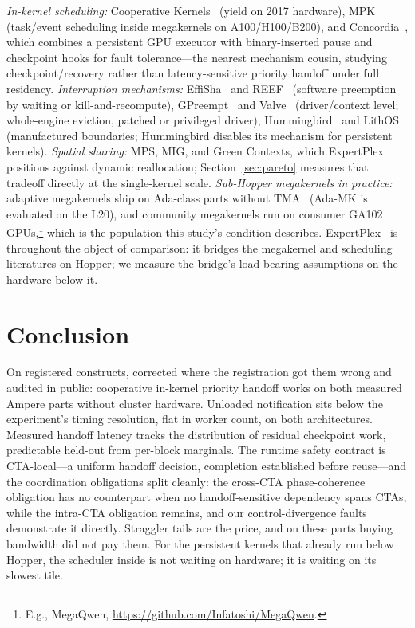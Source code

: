 \documentclass[11pt]{article}
\begin{document}
\emph{In-kernel scheduling:} Cooperative Kernels~\cite{coopkernels}
(yield on 2017 hardware), MPK~\cite{mpk} (task/event scheduling
inside megakernels on A100/H100/B200), and
Concordia~\cite{concordia}, which combines a persistent GPU executor
with binary-inserted pause and checkpoint hooks for fault
tolerance---the nearest mechanism cousin, studying
checkpoint/recovery rather than latency-sensitive priority handoff
under full residency. \emph{Interruption mechanisms:}
EffiSha~\cite{effisha} and REEF~\cite{reef} (software preemption by
waiting or kill-and-recompute), GPreempt~\cite{gpreempt} and
Valve~\cite{valve} (driver/context level; whole-engine eviction,
patched or privileged driver), Hummingbird~\cite{hummingbird} and
LithOS~\cite{lithos} (manufactured boundaries; Hummingbird disables
its mechanism for persistent kernels). \emph{Spatial sharing:} MPS,
MIG, and Green Contexts, which ExpertPlex positions against dynamic
reallocation; Section~\ref{sec:pareto} measures that tradeoff
directly at the single-kernel scale. \emph{Sub-Hopper megakernels in
practice:} adaptive megakernels ship on Ada-class parts without
TMA~\cite{adamk} (Ada-MK is evaluated on the L20), and community
megakernels run on consumer GA102
GPUs,\footnote{E.g., MegaQwen,
\url{https://github.com/Infatoshi/MegaQwen}.} which is the
population this study's condition describes.
ExpertPlex~\cite{expertplex} is throughout the object of comparison:
it bridges the megakernel and scheduling literatures on Hopper; we
measure the bridge's load-bearing assumptions on the hardware below
it.

\section{Conclusion}

On registered constructs, corrected where the registration got them
wrong and audited in public: cooperative in-kernel priority handoff
works on both measured Ampere parts without cluster hardware.
Unloaded notification sits below the experiment's timing resolution,
flat in worker count, on both architectures. Measured handoff
latency tracks the distribution of residual checkpoint work,
predictable held-out from per-block marginals. The runtime safety
contract is CTA-local---a uniform handoff decision, completion
established before reuse---and the coordination obligations split
cleanly: the cross-CTA phase-coherence obligation has no counterpart
when no handoff-sensitive dependency spans CTAs, while the intra-CTA
obligation remains, and our control-divergence faults demonstrate it
directly. Straggler tails are the price, and on these parts buying
bandwidth did not pay them. For the persistent kernels that already
run below Hopper, the scheduler inside is not waiting on hardware;
it is waiting on its slowest tile.
\end{document}
